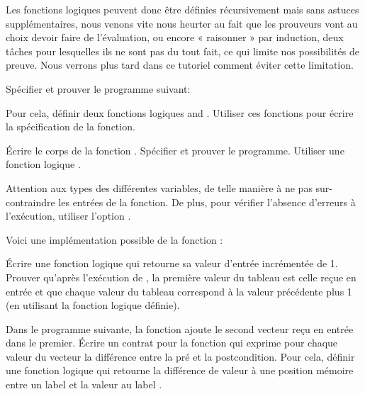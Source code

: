 Les fonctions logiques peuvent donc être définies récursivement mais sans astuces
supplémentaires, nous venons vite nous heurter au fait que les prouveurs vont au 
choix devoir faire de l'évaluation, ou encore « raisonner » par induction, deux 
tâches pour lesquelles ils ne sont pas du tout fait, ce qui limite nos 
possibilités de preuve. Nous verrons plus tard dans ce tutoriel comment éviter
cette limitation.






Spécifier et prouver le programme suivant:




Pour cela, définir deux fonctions logiques  and .
Utiliser ces fonctions pour écrire la spécification de la fonction.




Écrire le corps de la fonction . Spécifier et prouver le
programme. Utiliser une fonction logique .




Attention aux types des différentes variables, de telle manière à ne pas
sur-contraindre les entrées de la fonction. De plus, pour vérifier l'absence
d'erreurs à l'exécution, utiliser l'option .




Voici une implémentation possible de la fonction  :




Écrire une fonction logique qui retourne sa valeur d'entrée incrémentée de 1. 
Prouver qu'après l'exécution de , la première valeur du tableau
est celle reçue en entrée et que chaque valeur du tableau correspond à la valeur
précédente plus 1 (en utilisant la fonction logique définie).






Dans le programme suivante, la fonction  ajoute le second
vecteur reçu en entrée dans le premier. Écrire un contrat pour la fonction
 qui exprime pour chaque valeur du vecteur
 la différence entre la pré et la postcondition. Pour cela,
définir une fonction logique  qui retourne la différence de
valeur à une position mémoire entre un label  et la valeur au
label .




